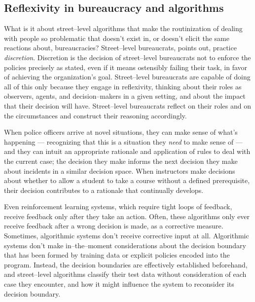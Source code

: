 \documentclass[main]{subfiles}
\begin{document}
\subsection{Reflexivity in bureaucracy and algorithms}

What is it about street--level algorithms that make the routinization of dealing with people so problematic
that doesn't exist in, or doesn't elicit the same reactions about, bureaucracies?
Street--level bureaucrats, \citeauthor{lipsky1983street} points out,
practice \textit{discretion}.
Discretion is the decision of street--level bureaucrats
not to enforce the policies precisely as stated,
even if it means ostensibly failing their task,
in favor of achieving the organization's goal.
Street--level bureaucrats are capable of doing all of this only because they engage in reflexivity,
thinking about their roles as
observers, agents, and decision--makers in a given setting, and
about the impact that their decision will have.
Street--level bureaucrats reflect on their roles and on the circumstances and construct their reasoning accordingly.

{}
When police officers arrive at novel situations, they can make sense of what's happening
--- recognizing that this is a situation they \textit{need} to make sense of ---
{and they can intuit an appropriate rationale and application of rules to deal with the current case;}
the decision they make informs the next decision they make about incidents in a similar decision space.
When instructors make decisions about whether to allow a student to take a course without a defined prerequisite,
their decision contributes to a rationale that continually develops.

{}
Even reinforcement learning systems, which require tight loops of feedback,
receive feedback only after they take an action.
Often, these algorithms only ever receive feedback after a wrong decision is made, as a corrective measure.
{Sometimes, algorithmic systems don't receive corrective input at all.}
Algorithmic systems don't make in--the--moment considerations about
the decision boundary that has been formed by training data or explicit policies encoded into the program.
{Instead, the decision boundaries are effectively established beforehand,
and street--level algorithms classify their test data without consideration of each case they encounter,
and how it might influence the system to reconsider its decision boundary.}
\end{document}
